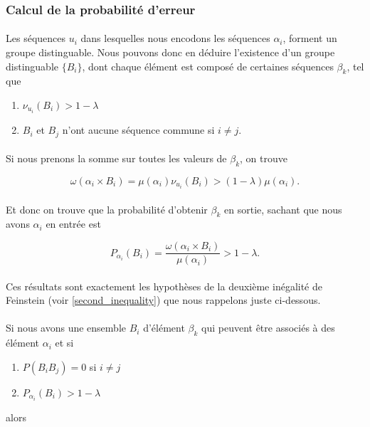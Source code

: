 \subsubsection*{Calcul de la probabilité d'erreur}
	
	\paragraph{}
	Les séquences $u_i$ dans lesquelles nous encodons les séquences $\alpha_i$,
	forment un groupe distinguable. Nous pouvons donc en déduire l'existence
	d'un groupe distinguable $\{B_i\}$, dont chaque élément est composé de 
	certaines séquences $\beta_k$, tel que 
	\begin{enumerate}
		\item $\nu_{u_i}(B_i) > 1-\lambda$
		\item $B_i$ et $B_j$ n'ont aucune séquence commune si $i\neq j$.
	\end{enumerate}
	
	\paragraph{}Si nous prenons la somme sur toutes les valeurs de $\beta_k$,
	on trouve
	
	\[
		\omega(\alpha_i \times B_i)=
		\mu(\alpha_i)\nu_{u_i}(B_i)>(1-\lambda)\mu(\alpha_i).
	\]
	
	\paragraph{}
	Et donc on trouve que la probabilité d'obtenir $\beta_k$ en sortie,
	sachant que nous avons $\alpha_i$ en entrée est
	
	\[
		P_{\alpha_i}(B_i)=
		\frac{\omega(\alpha_i \times B_i)}{\mu(\alpha_i)}>1-\lambda.
	\]
	
	\paragraph{}
	Ces résultats sont exactement les hypothèses de la deuxième inégalité 
	de Feinstein (voir \ref{second_inequality}) 
	que nous rappelons juste ci-dessous.
	
	\paragraph{}
	Si nous avons une ensemble $B_i$ d'élément $\beta_k$ qui peuvent être
	associés à des élément $\alpha_i$ et si 
	\begin{enumerate}
		\item $P(B_iB_j)=0$ si $i\neq j$
		\item $P_{\alpha_i}(B_i)>1-\lambda$
	\end{enumerate}
	alors 
	
